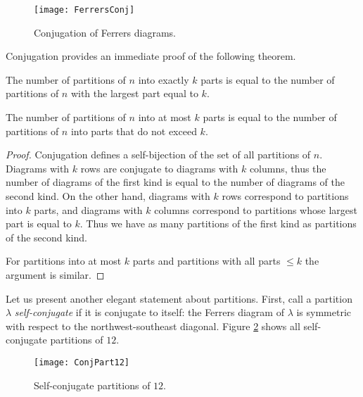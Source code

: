 \begin{page}


\begin{figure}[ht]
\begin{center}
\texttt{[image: FerrersConj]}
\end{center}
\caption{Conjugation of Ferrers diagrams.}
\label{fig:FerrersConj}
\end{figure}

Conjugation provides an immediate proof of the following theorem.


\end{page}

\begin{page}

\begin{thm}
\label{thm:RestrPart}
The number of partitions of $n$ into exactly $k$ parts is equal to the number of partitions of $n$ with the largest part equal to $k$.

The number of partitions of $n$ into at most $k$ parts is equal to the number of partitions of $n$ into parts that do not exceed $k$.
\end{thm}

\end{page}

\begin{page}

\begin{proof}
Conjugation defines a self-bijection of the set of all partitions of $n$.
Diagrams with $k$ rows are conjugate to diagrams with $k$ columns,
thus the number of diagrams of the first kind is equal to the number of diagrams of the second kind.
On the other hand, diagrams with $k$ rows correspond to partitions into $k$ parts,
and diagrams with $k$ columns correspond to partitions whose largest part is equal to $k$.
Thus we have as many partitions of the first kind as partitions of the second kind.

For partitions into at most $k$ parts and partitions with all parts $\le k$ the argument is similar.
\end{proof}


Let us present another elegant statement about partitions.
First, call a partition $\lambda$ \emph{self-conjugate} if it is conjugate to itself:
the Ferrers diagram of $\lambda$ is symmetric with respect to the northwest-southeast diagonal.
Figure \ref{fig:FerrersSelfConj} shows all self-conjugate partitions of $12$.

\begin{figure}[ht]
\begin{center}
\texttt{[image: ConjPart12]}
\end{center}
\caption{Self-conjugate partitions of $12$.}
\label{fig:FerrersSelfConj}
\end{figure}



\end{page}

